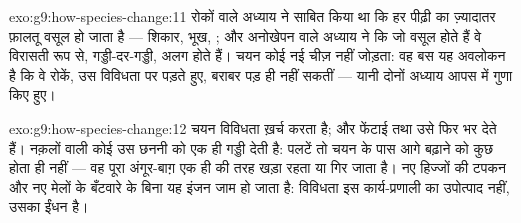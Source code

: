 \begin{solution}{exo:g9:how-species-change:11}
रोकों वाले अध्याय ने साबित किया था कि हर पीढ़ी का ज़्यादातर फ़ालतू वसूल
हो जाता है --- शिकार, भूख, ; और अनोखेपन वाले अध्याय ने कि जो
वसूल होते हैं वे विरासती रूप से, गड्डी-दर-गड्डी, अलग होते हैं। चयन कोई
नई चीज़ नहीं जोड़ता: वह बस यह अवलोकन है कि वे रोकें, उस विविधता पर पड़ते
हुए, बराबर पड़ ही नहीं सकतीं --- यानी दोनों अध्याय आपस में गुणा किए हुए।
\end{solution}

\begin{solution}{exo:g9:how-species-change:12}
चयन विविधता ख़र्च करता है; और फेंटाई तथा  उसे फिर भर देते हैं।
नक़लों वाली कोई  उस छननी को एक ही गड्डी देती है:  पलटें
तो चयन के पास आगे बढ़ाने को कुछ होता ही नहीं --- वह पूरा अंगूर-बाग़ एक ही
 की तरह खड़ा रहता या गिर जाता है। नए हिज्जों की टपकन और नए मेलों के
बँटवारे के बिना यह इंजन जाम हो जाता है: विविधता इस कार्य-प्रणाली का
उपोत्पाद नहीं, उसका ईंधन है।
\end{solution}

